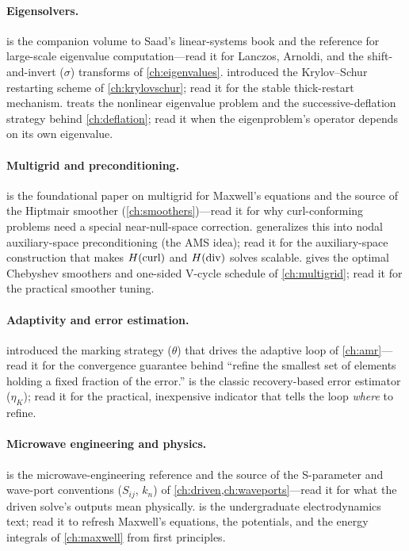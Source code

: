 \paragraph{Eigensolvers.}
\citet{saad2011eig} is the companion volume to Saad's linear-systems book and the
reference for large-scale eigenvalue computation---read it for Lanczos,
Arnoldi, and the shift-and-invert ($\sigma$) transforms of
\cref{ch:eigenvalues}. \citet{stewart2001krylovschur} introduced the
Krylov--Schur restarting scheme of \cref{ch:krylovschur}; read it for the
stable thick-restart mechanism. \citet{effenberger2013} treats the nonlinear
eigenvalue problem and the successive-deflation strategy behind
\cref{ch:deflation}; read it when the eigenproblem's operator depends on its own
eigenvalue.

\paragraph{Multigrid and preconditioning.}
\citet{hiptmair1998} is the foundational paper on multigrid for Maxwell's
equations and the source of the Hiptmair smoother (\cref{ch:smoothers})---read
it for why curl-conforming problems need a special near-null-space correction.
\citet{hiptmairxu2007} generalizes this into nodal auxiliary-space
preconditioning (the AMS idea); read it for the auxiliary-space construction
that makes $H(\mathrm{curl})$ and $H(\mathrm{div})$ solves scalable. \citet{phillipsfischer2022}
gives the optimal Chebyshev smoothers and one-sided V-cycle schedule of
\cref{ch:multigrid}; read it for the practical smoother tuning.

\paragraph{Adaptivity and error estimation.}
\citet{dorfler1996} introduced the marking strategy ($\theta$) that drives the
adaptive loop of \cref{ch:amr}---read it for the convergence guarantee behind
``refine the smallest set of elements holding a fixed fraction of the error.''
\citet{zienkiewiczzhu1987} is the classic recovery-based error estimator
($\eta_K$); read it for the practical, inexpensive indicator that tells the loop
\emph{where} to refine.

\paragraph{Microwave engineering and physics.}
\citet{pozar2011} is the microwave-engineering reference and the source of the
S-parameter and wave-port conventions ($S_{ij}$, $k_n$) of
\cref{ch:driven,ch:waveports}---read it for what the driven solve's outputs
mean physically. \citet{griffiths2017} is the undergraduate electrodynamics
text; read it to refresh Maxwell's equations, the potentials, and the energy
integrals of \cref{ch:maxwell} from first principles.

